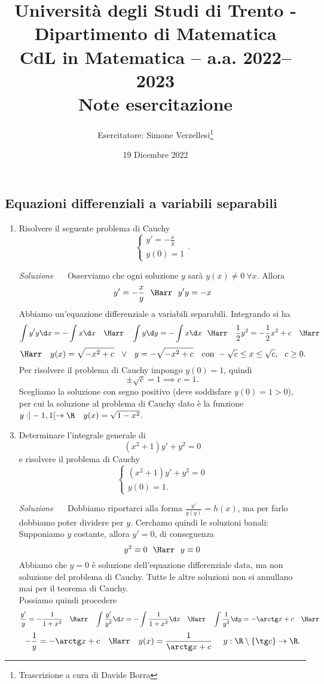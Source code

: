 \documentclass{article}
\title{Università degli Studi di Trento - Dipartimento di Matematica\\
CdL in Matematica – a.a. 2022–2023\\ Note esercitazione}
\author{Esercitatore: Simone Verzellesi\thanks{Trascrizione a cura di Davide Borra}}
\date{19 Dicembre 2022}
\begin{document}
\maketitle
{}
\setlength{\headheight}{30pt}
\subsection*{Equazioni differenziali a variabili separabili}
\begin{enumerate}[label=\textbf{Esercizio 13.\arabic*.},itemindent=*]
\item Risolvere il seguente problema di Cauchy
\[\begin{cases}
    y'=-\frac{x}{y}\\
    y(0)=1
\end{cases}.\]

\item[\textit{\large Soluzione~}]~
Osserviamo che ogni soluzione $y$ sarà $y(x)\neq 0 ~\forall x$. Allora
\[y'=-\frac{x}{y}~ ~ \Harr ~~ y'y=- x\]
Abbiamo un'equazione differenziale a variabili separabili. Integrando si ha 
\[\int y'y\d x=-\int x \d x~~~\Harr~~~\int y\d y =-\int x \d x~~\Harr~~~\frac{1}{2}y^2=-\frac{1}{2}x^2+c~~~\Harr\]
\[\Harr~~~y(x)=\sqrt{-x^2+c}~~\lor~~ y=-\sqrt{-x^2+c}~~~\text{con}~-\sqrt{c}\leq x\leq \sqrt{c},~ ~ c\geq 0.\]
Per risolvere il problema di Cauchy impongo $y(0)=1$, quindi
\[\pm\sqrt{c}=1\implies c=1.\]
Scegliamo la soluzione con segno positivo (deve soddisfare $y(0)=1>0$), per cui la soluzione al problema di Cauchy dato è la funzione $y:]-1,1[\to \R~~~y(x)=\sqrt{1-x^2}$.
\item Determinare l'integrale generale di 
\[
    (x^2+1)y'+y^2=0   
\]
e risolvere il problema di Cauchy
\[\begin{cases}
    (x^2+1)y'+y^2=0 \\
    y(0)=1.
\end{cases}\]
\item[\textit{\large Soluzione~}]~ Dobbiamo riportarci alla forma $\frac{y'}{g(y)}=h(x)$, ma per farlo dobbiamo poter dividere per $y$. Cerchamo quindi le soluzioni banali: Supponiamo $y$ costante, allora $y'=0$, di conseguenza
\[y^2\equiv 0~~\Harr~~y\equiv 0\]
Abbiamo che $y=0$ è soluzione dell'equazione differenziale data, ma non soluzione del problema di Cauchy. Tutte le altre soluzioni non si annullano mai per il teorema di Cauchy.\\
Possiamo quindi procedere
\[\frac{y'}{y}=-\frac{1}{1+x^2}~~~\Rarr~~~\int\frac{y'}{y^2}\d x=-\int\frac{1}{1+x^2}\d x~~~\Harr~~~\int\frac{1}{y^2}\d y=-\arctg x+c~~~\Harr\]
\[-\frac{1}{y}=-\arctg x +c~~~\Harr~~~y(x)=\frac{1}{\arctg x +c}~~~~y: \R\setminus \{\tg c\}\to \R.\]


\end{enumerate}
\end{document}
